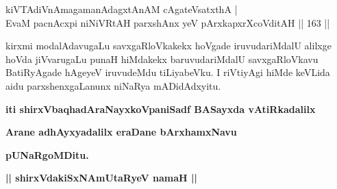 
\begin{shl}
kiVTAdiVnAmagamanAdagxtAnAM cA\s \s gateVsatxthA | \\
EvaM pacnAcxpi niNiVRtAH parxshAnx yeV pArxkapxrXcoVditAH \hfill|| 163 || 
\end{shl}

\begin{artha}
kirxmi modalAdavugaLu savxgaRloVkakekx hoVgade iruvudariMdalU alilxge hoVda jiVvarugaLu punaH hiMdakekx baruvudariMdalU savxgaRloVkavu BatiRyAgade hAgeyeV iruvudeMdu tiLiyabeVku. I riVtiyAgi hiMde keVLida aidu parxshenxgaLanunx niNaRya mADidAdxyitu.
\end{artha}


\begin{center}
{\bf iti shirxVbaqhadAraNayxkoVpaniSadf BASayxda vAtiRkadalilx}
\smallskip

{\bf Arane adhAyxyadalilx eraDane bArxhamxNavu}
\smallskip

{\bf pUNaRgoMDitu.}

\smallskip
{\bf || shirxVdakiSxNAmUtaRyeV namaH ||}
\end{center}
